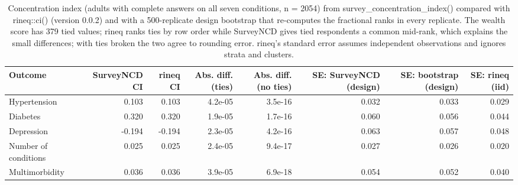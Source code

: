 \begin{table}

\caption{\label{tab:tab_validation_rineq}Concentration index (adults with complete answers on all seven conditions, n = 2054) from survey\_concentration\_index() compared with rineq::ci() (version 0.0.2) and with a 500-replicate design bootstrap that re-computes the fractional ranks in every replicate. The wealth score has 379 tied values; rineq ranks ties by row order while SurveyNCD gives tied respondents a common mid-rank, which explains the small differences; with ties broken the two agree to rounding error. rineq's standard error assumes independent observations and ignores strata and clusters.}
\centering
\begin{tabular}[t]{lrrrrrrr}
\toprule
Outcome & SurveyNCD CI & rineq CI & Abs. diff. (ties) & Abs. diff. (no ties) & SE: SurveyNCD (design) & SE: bootstrap (design) & SE: rineq (iid)\\
\midrule
Hypertension & 0.103 & 0.103 & 4.2e-05 & 3.5e-16 & 0.032 & 0.033 & 0.029\\
Diabetes & 0.320 & 0.320 & 1.9e-05 & 1.7e-16 & 0.060 & 0.056 & 0.044\\
Depression & -0.194 & -0.194 & 2.3e-05 & 4.2e-16 & 0.063 & 0.057 & 0.048\\
Number of conditions & 0.025 & 0.025 & 2.4e-05 & 9.4e-17 & 0.027 & 0.026 & 0.020\\
Multimorbidity & 0.036 & 0.036 & 3.9e-05 & 6.9e-18 & 0.054 & 0.052 & 0.040\\
\bottomrule
\end{tabular}
\end{table}
